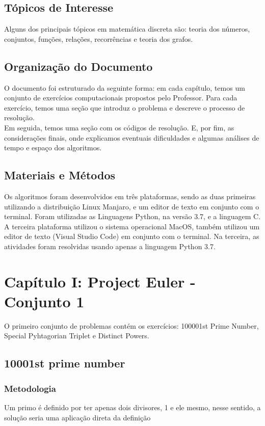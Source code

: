 \documentclass{article}
\begin{document}
    \subsection{Tópicos de Interesse}
    Alguns dos principais tópicos em matemática discreta são: teoria dos números, conjuntos, funções, relações, recorrências e teoria dos grafos.
    
    \subsection{Organização do Documento}
    O documento foi estruturado da seguinte forma: em cada capítulo, temos um conjunto de exercícios computacionais propostos pelo Professor. Para cada exercício, temos uma seção que introduz o problema e descreve o processo de resolução.\\
    Em seguida, temos uma seção com os códigos de resolução. E, por fim, as considerações finais, onde explicamos eventuais dificuldades e algumas análises de tempo e espaço dos algoritmos.\\
    
    \subsection{Materiais e Métodos}
    Os algoritmos foram desenvolvidos em três plataformas, sendo as duas primeiras utilizando a distribuição Linux Manjaro, e um editor de texto em conjunto com o terminal. Foram utilizadas as Linguagens Python, na versão 3.7, e a linguagem C. A terceira plataforma utilizou o sistema operacional MacOS, também utilizou um editor de texto (Visual Studio Code) em conjunto com o terminal. Na terceira, as atividades foram resolvidas usando apenas a linguagem Python 3.7.
\clearpage

\section{Capítulo I: Project Euler - Conjunto 1}
O primeiro conjunto de problemas contém os exercícios: 100001st Prime Number, Special Pyhtagorian Triplet e Distinct Powers.
    \subsection{10001st prime number }
       
        \subsubsection{Metodologia} 
        Um primo é definido por ter apenas dois divisores, 1 e ele mesmo, nesse sentido, a solução seria uma aplicação direta da definição
       
\end{document}
